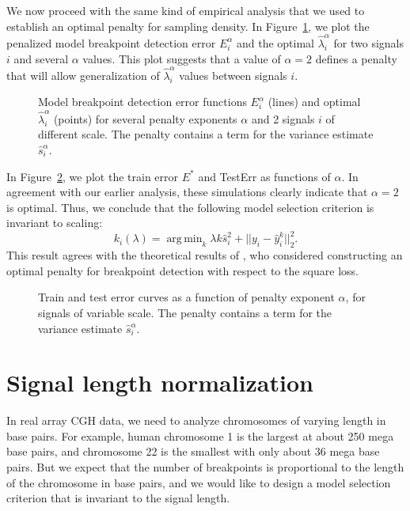 \documentclass{jsfds} %
\newcommand{\fig}[3][H]{
  \begin{figure}[#1]
    \hskip -1cm
    
    \caption{#3}
    \label{fig:#2}
  \end{figure}
}
\DeclareMathOperator*{\argmin}{arg\,min}
\begin{document}
\newpage

We now proceed with the same kind of empirical analysis that we used
to establish an optimal penalty for sampling density. In
Figure~\ref{fig:variable-scale-berr}, we plot the penalized model
breakpoint detection error $E_i^\alpha$ and the optimal $\hat
\lambda_i^\alpha$ for two signals $i$ and several $\alpha$ values.
This plot suggests that a value of $\alpha=2$ defines a penalty that
will allow generalization of $\hat \lambda^\alpha_i$ values between
signals $i$.

\fig{variable-scale-berr}{Model breakpoint detection error functions
  $E_i^\alpha$ (lines) and optimal $\hat \lambda_i^\alpha$ (points)
  for several penalty exponents $\alpha$ and 2 signals $i$ of
  different scale. The penalty contains a term for the variance
  estimate $\hat s_i^\alpha$.}

\newpage

In Figure~\ref{fig:variable-scale-error-alpha}, we plot the train
error $E^*$ and TestErr as functions of $\alpha$.  In agreement with
our earlier analysis, these simulations clearly indicate that
$\alpha=2$ is optimal. Thus, we conclude that the following model
selection criterion is invariant to scaling:
\begin{equation}
  \label{eq:kstar_shat_opt}
  k_i(\lambda) = \argmin_k \lambda k \hat s_i^2 + ||y_i-\hat y_i^k||^2_2.
\end{equation}
This result agrees with the theoretical results of \citet{lebarbier},
who considered constructing an optimal penalty for breakpoint
detection with respect to the square loss.


\fig{variable-scale-error-alpha}{Train and test error curves as a
  function of penalty exponent $\alpha$, for signals of variable
  scale. The penalty contains a term for the variance estimate $\hat
  s_i^\alpha$.}



\newpage
\section{Signal length normalization}
\label{variable_size}
In real array CGH data, we need to analyze chromosomes of varying length
in base pairs. For example, human chromosome 1 is the largest at about
250 mega base pairs, and chromosome 22 is the smallest with only about
36 mega base pairs. But we expect that the number of breakpoints is
proportional to the length of the chromosome in base pairs, and we would
like to design a model selection criterion that is invariant to the
signal length.
\end{document}
